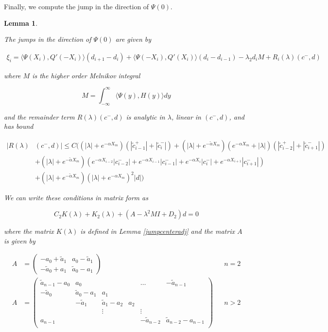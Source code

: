 \documentclass[12pt]{article}
\newtheorem{lemma}{Lemma}
\begin{document}
Finally, we compute the jump in the direction of $\Psi(0)$.

\begin{lemma}\label{jumpadj}

The jumps in the direction of $\Psi(0)$ are given by

\begin{align}\label{xi}
\xi_i = \langle \Psi(X_i), Q'(-X_i) \rangle (d_{i+1} - d_i)
+ \langle \Psi(-X_i), Q'(X_i) \rangle (d_i - d_{i-1})
- \lambda_2 d_i M + R_i(\lambda)(c^-, d)
\end{align}

where $M$ is the higher order Melnikov integral

\begin{equation}\label{M}
M = \int_{-\infty}^\infty \langle \Psi(y), H(y) \rangle dy 
\end{equation}

and the remainder term $R(\lambda)(c^-, d)$ is analytic in $\lambda$, linear in $(c^-, d)$, and has bound

\begin{align}\label{R}
|R(\lambda)&(c^-, d)| \leq C \Big(
(|\lambda| + e^{-\alpha X_m})(|\tilde{c}_{i-1}^+| + |\tilde{c}_{i}^-|) + (|\lambda| + e^{-\tilde{\alpha} X_m})(e^{-\alpha X_m} + |\lambda|) ( |\tilde{c}_{i-2}^+| + |\tilde{c}_{i+1}^-|) \\
&+ (|\lambda| + e^{-\tilde{\alpha} X_m})( e^{-\alpha X_{i-2}} |c_{i-2}^-| + e^{-\alpha X_{i-1}} |c_{i-1}^-| + e^{-\alpha X_i} |c_i^-| + e^{-\alpha X_{i+1}} |c_{i+1}^-|) \nonumber \\
&+ (|\lambda| + e^{-\tilde{\alpha} X_m})(|\lambda| + e^{-\alpha X_m})^2 |d| \nonumber \Big)
\end{align}

We can write these conditions in matrix form as

\begin{equation}
C_2 K(\lambda) + K_2(\lambda) + (A - \lambda^2 M I + D_2)d = 0
\end{equation}

where the matrix $K(\lambda)$ is defined in Lemma \ref{jumpcenteradj} and the matrix $A$ is given by

\begin{align*}
A &= \begin{pmatrix}
-a_0 + \tilde{a}_1 & a_0 - \tilde{a}_1 \\
-\tilde{a}_0 + a_1 & \tilde{a}_0 - a_1
\end{pmatrix} && n = 2 \\
A &= \begin{pmatrix}
\tilde{a}_{n-1} - a_0 & a_0 & & & \dots & -\tilde{a}_{n-1}\\
-\tilde{a}_0 & \tilde{a}_0 - a_1 &  a_1 \\
& -\tilde{a}_1 & \tilde{a}_1 - a_2 &  a_2 \\
& & \vdots & & \vdots \\
a_{n-1} & & & & -\tilde{a}_{n-2} & \tilde{a}_{n-2} - a_{n-1} \\
\end{pmatrix} && n > 2
\end{align*}


\end{lemma}
\end{document}
